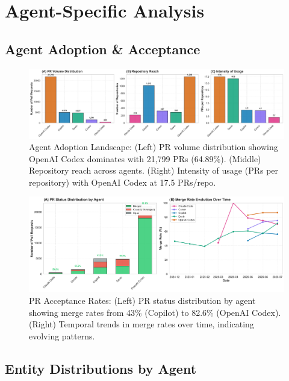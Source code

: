 \documentclass[11pt]{article}
\begin{document}
\section{Agent-Specific Analysis}

\subsection{Agent Adoption \& Acceptance}

\begin{figure}[H]
\centering
\includegraphics[width=\textwidth]{figures/fig1_agent_adoption_landscape.png}
\caption{Agent Adoption Landscape: (Left) PR volume distribution showing OpenAI Codex dominates with 21,799 PRs (64.89\%). (Middle) Repository reach across agents. (Right) Intensity of usage (PRs per repository) with OpenAI Codex at 17.5 PRs/repo.}
\label{fig:agent_adoption}
\end{figure}

\begin{figure}[H]
\centering
\includegraphics[width=\textwidth]{figures/fig2_pr_acceptance_rates.png}
\caption{PR Acceptance Rates: (Left) PR status distribution by agent showing merge rates from 43\% (Copilot) to 82.6\% (OpenAI Codex). (Right) Temporal trends in merge rates over time, indicating evolving patterns.}
\label{fig:pr_acceptance}
\end{figure}

\subsection{Entity Distributions by Agent}
\end{document}
